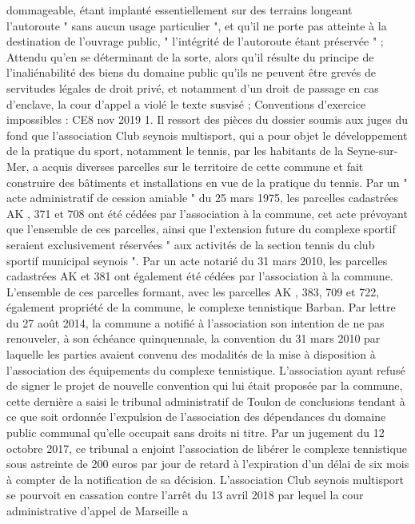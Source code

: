 \documentclass[11pt,a4paper]{report}
\begin{document}
dommageable, étant implanté essentiellement sur des terrains longeant l'autoroute " sans aucun usage particulier
", et qu'il ne porte pas atteinte à la destination de l'ouvrage public, " l'intégrité de l'autoroute étant préservée " ;
Attendu qu'en se déterminant de la sorte, alors qu'il résulte du principe de l'inaliénabilité des biens du domaine
public qu'ils ne peuvent être grevés de servitudes légales de droit privé, et notamment d'un droit de passage en
cas d'enclave, la cour d'appel a violé le texte susvisé ;
Conventions d’exercice impossibles : CE8 nov 2019 
1. Il ressort des pièces du dossier soumis aux juges du fond que l'association Club seynois multisport, qui a pour
objet le développement de la pratique du sport, notamment le tennis, par les habitants de la Seyne-sur-Mer, a
acquis diverses parcelles sur le territoire de cette commune et fait construire des bâtiments et installations en vue
de la pratique du tennis. Par un " acte administratif de cession amiable " du 25 mars 1975, les parcelles cadastrées
AK , 371 et 708 ont été cédées par l'association à la commune, cet acte prévoyant que l'ensemble de ces
parcelles, ainsi que l'extension future du complexe sportif seraient exclusivement réservées " aux activités de la
section tennis du club sportif municipal seynois ". Par un acte notarié du 31 mars 2010, les parcelles cadastrées
AK  et 381 ont également été cédées par l'association à la commune. L'ensemble de ces parcelles formant,
avec les parcelles AK , 383, 709 et 722, également propriété de la commune, le complexe tennistique
Barban. Par lettre du 27 août 2014, la commune a notifié à l'association son intention de ne pas renouveler, à son
échéance quinquennale, la convention du 31 mars 2010 par laquelle les parties avaient convenu des modalités de
la mise à disposition à l'association des équipements du complexe tennistique. L'association ayant refusé de signer
le projet de nouvelle convention qui lui était proposée par la commune, cette dernière a saisi le tribunal
administratif de Toulon de conclusions tendant à ce que soit ordonnée l'expulsion de l'association des dépendances
du domaine public communal qu'elle occupait sans droits ni titre. Par un jugement du 12 octobre 2017, ce tribunal
a enjoint l'association de libérer le complexe tennistique sous astreinte de 200 euros par jour de retard à
l'expiration d'un délai de six mois à compter de la notification de sa décision. L'association Club seynois multisport
se pourvoit en cassation contre l'arrêt du 13 avril 2018 par lequel la cour administrative d'appel de Marseille a
\end{document}
